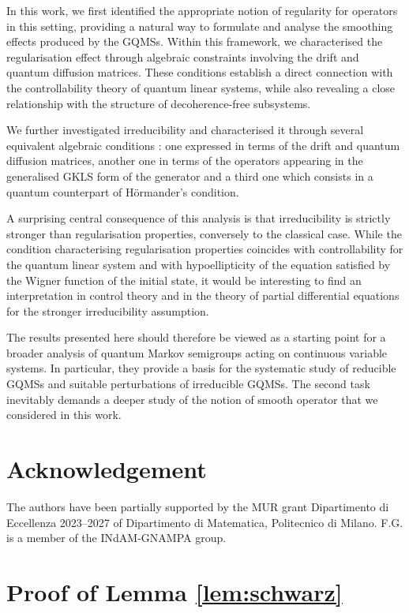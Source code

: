 \documentclass[preprint]{elsarticle}
\theoremstyle{definition}
\begin{document}
In this work, we first identified the appropriate notion of regularity for operators in this setting, providing a natural way to formulate and analyse the smoothing effects produced by the GQMSs. Within this framework, we characterised the regularisation effect through algebraic constraints involving the drift and quantum diffusion matrices. These conditions establish a direct connection with the controllability theory of quantum linear systems, while also revealing a close relationship with the structure of decoherence-free subsystems.

We further investigated irreducibility and characterised it through several equivalent algebraic conditions : one expressed in terms of the drift and quantum diffusion matrices, another one in terms of the operators appearing in the generalised GKLS form of the generator and a third one which consists in a quantum counterpart of H\"ormander's condition.

A surprising central consequence of this analysis is that irreducibility is strictly stronger than regularisation properties, conversely to the classical case. While the condition characterising regularisation properties coincides with controllability for the quantum linear system and with hypoellipticity of the equation satisfied by the Wigner function of the initial state, it would be interesting to find an interpretation in control theory and in the theory of partial differential equations for the stronger irreducibility assumption.

The results presented here should therefore be viewed as a starting point for a broader analysis of quantum Markov semigroups acting on continuous variable systems. In particular, they provide a basis for the systematic study of reducible GQMSs and suitable perturbations of irreducible GQMSs. The second task inevitably demands a deeper study of the notion of smooth operator that we considered in this work.

\section*{Acknowledgement}

The authors have been partially supported by the MUR grant Dipartimento di Eccellenza
2023–2027 of Dipartimento di Matematica, Politecnico di Milano. F.G. is a member of the INdAM-GNAMPA group.

\appendix

\section{Proof of Lemma \ref{lem:schwarz}} \label{app:A}
\end{document}
